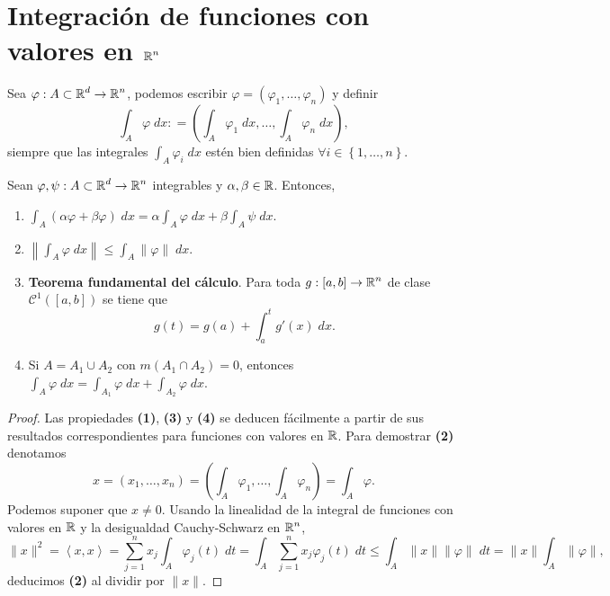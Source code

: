 \section{Integración de funciones con valores en $\displaystyle \mathbb{R}^n $}
Sea $\displaystyle \varphi : A \subset \mathbb{R}^{d}\to \mathbb{R}^{n} $, podemos escribir $\displaystyle \varphi = \left(\varphi_{1}, \ldots, \varphi_{n}\right) $ y definir
\[\int _{A} \varphi \; d x : = \left(\int _{A}\varphi_{1} \; dx, \ldots, \int _{A}\varphi_{n} \; dx\right),\]
siempre que las integrales $\displaystyle \int _{A}\varphi_{i} \; dx $ estén bien definidas $\displaystyle \forall i \in \left\{ 1, \ldots, n\right\}  $. 
\begin{prop}
Sean $\displaystyle \varphi, \psi : A\subset \mathbb{R}^{d} \to \mathbb{R}^{n} $ integrables y $\displaystyle \alpha, \beta \in \mathbb{R} $. Entonces, 
\begin{enumerate}
\item $\displaystyle \int _{A}\left(\alpha\varphi + \beta\varphi\right) \; dx = \alpha\int _{A}\varphi \; dx + \beta\int _{A}\psi \; dx $. 
\item $\displaystyle \left\|\int _{A}\varphi \; dx\right\| \leq \int _{A}\|\varphi\| \; dx$. 
\item \textbf{Teorema fundamental del cálculo}. Para toda $\displaystyle g : \left[a,b\right] \to \mathbb{R}^{n} $ de clase $\displaystyle \mathcal{C}^{1}\left(\left[a,b\right] \right) $ se tiene que 
	\[g\left(t\right)=g\left(a\right)+\int^{t}_{a} g'\left(x\right) \; dx .\]
\item Si $\displaystyle A = A_{1} \cup A_{2} $ con $\displaystyle m\left(A_{1} \cap A_{2}\right)=0 $, entonces $\displaystyle \int _{A}\varphi \; dx = \int _{A_{1}}\varphi \; dx + \int _{A_{2}}\varphi \; dx $. 
\end{enumerate}
\end{prop}
\begin{proof}
Las propiedades \textbf{(1)}, \textbf{(3)} y \textbf{(4)} se deducen fácilmente a partir de sus resultados correspondientes para funciones con valores en $\displaystyle \mathbb{R} $. Para demostrar \textbf{(2)} denotamos 
\[x = \left(x_{1}, \ldots, x_{n}\right)=\left(\int _{A}\varphi_{1} , \ldots, \int _{A}\varphi_{n} \right)=\int _{A}\varphi .\]
Podemos suponer que $\displaystyle x \neq 0 $. Usando la linealidad de la integral de funciones con valores en $\displaystyle \mathbb{R} $ y la desigualdad Cauchy-Schwarz en $\displaystyle \mathbb{R}^{n} $,
\[\|x\|^{2}=\left\langle x, x \right\rangle  =\sum^{n}_{j= 1}x_{j}\int _{A}\varphi_{j}\left(t\right) \; dt = \int _{A}\sum^{n}_{j = 1}x_{j}\varphi_{j}\left(t\right) \; dt \leq \int _{A}\|x\| \|\varphi\| \; dt = \|x\|\int _{A}\|\varphi\|,\]
deducimos \textbf{(2)} al dividir por $\displaystyle \|x\| $. 
\end{proof}

